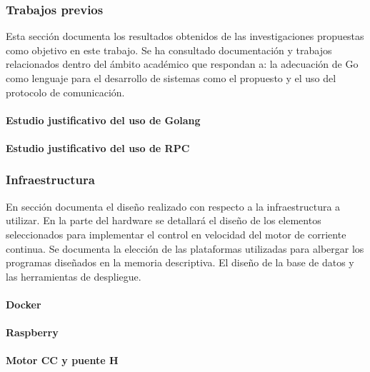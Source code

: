 \subsubsection{Trabajos previos}
Esta sección documenta los resultados obtenidos de las investigaciones propuestas como objetivo en este trabajo.
Se ha consultado documentación y trabajos relacionados dentro del ámbito académico que respondan a: la adecuación de Go como lenguaje para el desarrollo de sistemas como el propuesto y
el uso del protocolo de comunicación.

\paragraph{Estudio justificativo del uso de Golang}



\paragraph{Estudio justificativo del uso de RPC}


\subsubsection{Infraestructura}\label{subsubsec:infraestructura}

En sección documenta el diseño realizado con respecto a la infraestructura a utilizar.
En la parte del hardware se detallará el diseño de los elementos seleccionados para implementar el control en velocidad del motor de corriente continua.
Se documenta la elección de las plataformas utilizadas para albergar los programas diseñados en la memoria descriptiva.
El diseño de la base de datos y las herramientas de despliegue.

\paragraph{Docker}\label{par:Docker}


\paragraph{Raspberry}


\paragraph{Motor CC y puente H}



